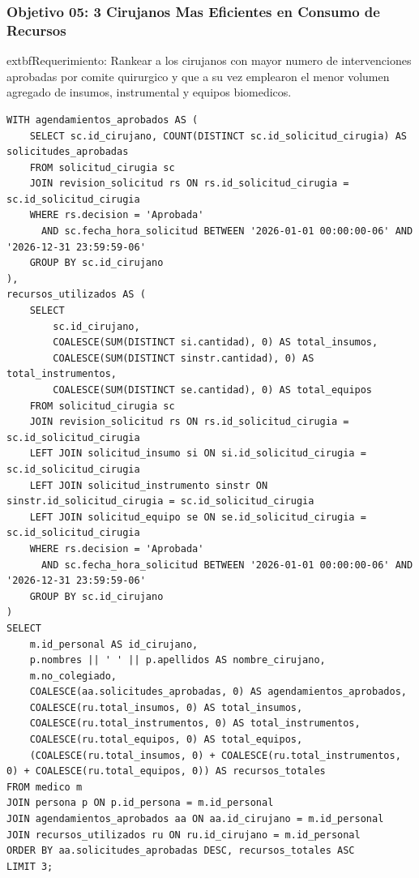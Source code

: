 \documentclass[11pt,a4paper]{article}
\begin{document}
\subsubsection{Objetivo 05: 3 Cirujanos Mas Eficientes en Consumo de Recursos}
	extbf{Requerimiento:} Rankear a los cirujanos con mayor numero de intervenciones aprobadas por comite quirurgico y que a su vez emplearon el menor volumen agregado de insumos, instrumental y equipos biomedicos.
\begin{lstlisting}[style=sqlstyle]
WITH agendamientos_aprobados AS (
    SELECT sc.id_cirujano, COUNT(DISTINCT sc.id_solicitud_cirugia) AS solicitudes_aprobadas
    FROM solicitud_cirugia sc
    JOIN revision_solicitud rs ON rs.id_solicitud_cirugia = sc.id_solicitud_cirugia
    WHERE rs.decision = 'Aprobada'
      AND sc.fecha_hora_solicitud BETWEEN '2026-01-01 00:00:00-06' AND '2026-12-31 23:59:59-06'
    GROUP BY sc.id_cirujano
),
recursos_utilizados AS (
    SELECT 
        sc.id_cirujano,
        COALESCE(SUM(DISTINCT si.cantidad), 0) AS total_insumos,
        COALESCE(SUM(DISTINCT sinstr.cantidad), 0) AS total_instrumentos,
        COALESCE(SUM(DISTINCT se.cantidad), 0) AS total_equipos
    FROM solicitud_cirugia sc
    JOIN revision_solicitud rs ON rs.id_solicitud_cirugia = sc.id_solicitud_cirugia
    LEFT JOIN solicitud_insumo si ON si.id_solicitud_cirugia = sc.id_solicitud_cirugia
    LEFT JOIN solicitud_instrumento sinstr ON sinstr.id_solicitud_cirugia = sc.id_solicitud_cirugia
    LEFT JOIN solicitud_equipo se ON se.id_solicitud_cirugia = sc.id_solicitud_cirugia
    WHERE rs.decision = 'Aprobada'
      AND sc.fecha_hora_solicitud BETWEEN '2026-01-01 00:00:00-06' AND '2026-12-31 23:59:59-06'
    GROUP BY sc.id_cirujano
)
SELECT 
    m.id_personal AS id_cirujano,
    p.nombres || ' ' || p.apellidos AS nombre_cirujano,
    m.no_colegiado,
    COALESCE(aa.solicitudes_aprobadas, 0) AS agendamientos_aprobados,
    COALESCE(ru.total_insumos, 0) AS total_insumos,
    COALESCE(ru.total_instrumentos, 0) AS total_instrumentos,
    COALESCE(ru.total_equipos, 0) AS total_equipos,
    (COALESCE(ru.total_insumos, 0) + COALESCE(ru.total_instrumentos, 0) + COALESCE(ru.total_equipos, 0)) AS recursos_totales
FROM medico m
JOIN persona p ON p.id_persona = m.id_personal
JOIN agendamientos_aprobados aa ON aa.id_cirujano = m.id_personal
JOIN recursos_utilizados ru ON ru.id_cirujano = m.id_personal
ORDER BY aa.solicitudes_aprobadas DESC, recursos_totales ASC
LIMIT 3;
\end{lstlisting}
\end{document}
